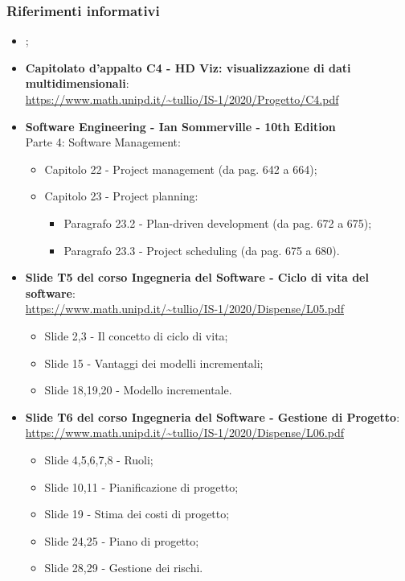 \subsubsection{Riferimenti informativi}
\begin{itemize}
	\item \textbf{};
	
	\item \textbf{Capitolato d'appalto C4 - HD Viz: visualizzazione di dati multidimensionali}:\\
	\textcolor{blue}{\url{https://www.math.unipd.it/~tullio/IS-1/2020/Progetto/C4.pdf}}
	
	\item \textbf{Software Engineering - Ian Sommerville - 10th Edition}\\ 
	Parte 4: Software Management:
	\begin{itemize}
	\item Capitolo 22 - Project management (da pag. 642 a 664);
	\item Capitolo 23 - Project planning:
		\begin{itemize}
			\item Paragrafo 23.2 - Plan-driven development (da pag. 672 a 675);
			\item Paragrafo 23.3 - Project scheduling (da pag. 675 a 680).
		\end{itemize}
	\end{itemize}		 
	
	\item \textbf{Slide T5 del corso Ingegneria del Software - Ciclo di vita del software}:\\
	\textcolor{blue}{\url{https://www.math.unipd.it/~tullio/IS-1/2020/Dispense/L05.pdf}}
	\begin{itemize}
		\item Slide 2,3 - Il concetto di ciclo di vita;
		\item Slide 15 - Vantaggi dei modelli incrementali;
		\item Slide 18,19,20 - Modello incrementale.
	\end{itemize}
	
	\item \textbf{Slide T6 del corso Ingegneria del Software - Gestione di Progetto}:\\
	\textcolor{blue}{\url{https://www.math.unipd.it/~tullio/IS-1/2020/Dispense/L06.pdf}}
	\begin{itemize}
		\item Slide 4,5,6,7,8 - Ruoli;
		\item Slide 10,11 - Pianificazione di progetto;
		\item Slide 19 - Stima dei costi di progetto;
		\item Slide 24,25 - Piano di progetto;
		\item Slide 28,29 - Gestione dei rischi.
	\end{itemize}
\end{itemize}

